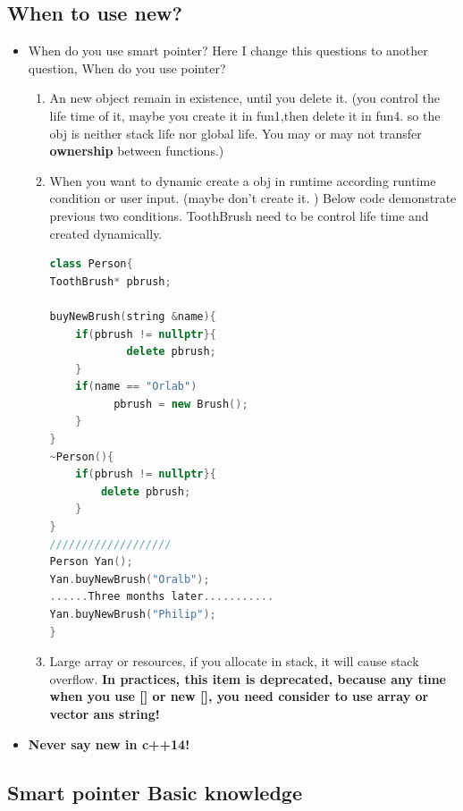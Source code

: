 \documentclass[a4paper,12pt,twoside]{book}
\begin{document}
\subsection{When to use new?}
\begin{itemize}

\item When do you use smart pointer? Here I change this questions to another question, When do you use pointer?
\begin{enumerate}
\item An new object remain in existence, until you delete it. (you control the life time of it, maybe you create it in fun1,then delete it in fun4. so the obj is neither stack life nor global life. You may or may not transfer \textbf{ownership} between functions.)

\item When you want to dynamic create a obj in runtime according runtime condition or user input. (maybe don't create it. ) Below code demonstrate previous two conditions.  ToothBrush need to be control life time and created dynamically.
\begin{lstlisting}[frame=single, language=c++]
class Person{
ToothBrush* pbrush;

buyNewBrush(string &name){
    if(pbrush != nullptr}{
	    	delete pbrush;
    }
    if(name == "Orlab")
          pbrush = new Brush();
    }
}
~Person(){
	if(pbrush != nullptr}{
		delete pbrush;
    }
}
///////////////////
Person Yan();
Yan.buyNewBrush("Oralb");
......Three months later...........
Yan.buyNewBrush("Philip");
}
\end{lstlisting}

\item Large array or resources,  if you allocate in stack, it will cause stack overflow. \textbf{In practices, this item is deprecated, because any time when you use [] or new [], you need consider to use array or vector ans string!}
\end{enumerate}

\item \textbf{Never say new in c++14!} 
\end{itemize}


\subsection{Smart pointer Basic knowledge}
\end{document}
